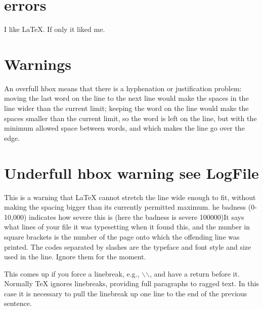 \documentclass{article} %
\begin{document}
\section{errors} %

I like \LaTeX. If only it liked me. %

\section{Warnings}

An overfull hbox means that there is a hyphenation or justification problem: moving the last word on the line to the next line would make the spaces in the line wider than the current limit; keeping the word on the line would make the spaces smaller than the current limit, so the word is left on the line, but with the minimum allowed space between words, and which makes the line go over the edge.


\section{Underfull hbox warning see LogFile}

This is a warning that LaTeX cannot stretch the line wide enough to fit, without making the spacing bigger than its currently permitted maximum. he badness (0-10,000) indicates how severe this is (here the badness is severe 100000)It says what lines of your file it was typesetting when it found this, and the number in square brackets is the number of the page onto which the offending line was printed. The codes separated by slashes are the typeface and font style and size used in the line. Ignore them for the moment.

This comes up if you force a linebreak, e.g., $\backslash$$\backslash$, and have a return before it. Normally TeX ignores linebreaks, providing full paragraphs to ragged text. In this case it is necessary to pull the linebreak up one line to the end of the previous sentence.
\end{document}
